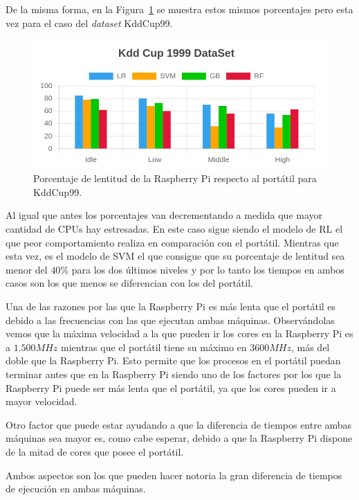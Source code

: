 \documentclass[a4paper, 12pt]{book}
\begin{document}
De la misma forma, en la Figura~\ref{fig:per_kdd} se muestra estos mismos porcentajes pero esta vez para el caso del \textit{dataset} KddCup99.

\begin{figure}[htb]
  \centering
  \includegraphics[width=14cm, keepaspectratio]{img/per_kdd.png}
  \caption{Porcentaje de lentitud de la Raspberry Pi respecto al portátil para KddCup99.}
  \label{fig:per_kdd}
\end{figure}

Al igual que antes los porcentajes van decrementando a medida que mayor cantidad de CPUs hay estresadas. En este caso sigue siendo el modelo de RL el que peor comportamiento realiza en comparación con el portátil. Mientras que esta vez, es el modelo de SVM el que consigue que su porcentaje de lentitud sea menor del $40\%$ para los dos últimos niveles y por lo tanto los tiempos en ambos casos son los que menos se diferencian con los del portátil.

Una de las razones por las que la Raspberry Pi es más lenta que el portátil es debido a las frecuencias con las que ejecutan ambas máquinas. Observándolas vemos que la máxima velocidad a la que pueden ir los cores en la Raspberry Pi es a $1.500MHz$ mientras que el portátil tiene su máximo en $3600MHz$, más del doble que la Raspberry Pi. Esto permite que los procesos en el portátil puedan terminar antes que en la Raspberry Pi siendo uno de los factores por los que la Raspberry Pi puede ser más lenta que el portátil, ya que los cores pueden ir a mayor velocidad.

Otro factor que puede estar ayudando a que la diferencia de tiempos entre ambas máquinas sea mayor es, como cabe esperar, debido a que la Raspberry Pi dispone de la mitad de cores que posee el portátil.

Ambos aspectos son los que pueden hacer notoria la gran diferencia de tiempos de ejecución en ambas máquinas.
\end{document}
